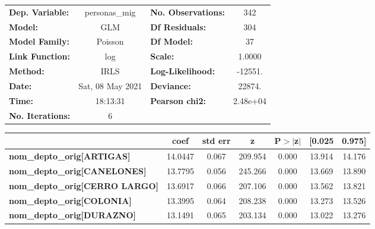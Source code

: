 \begin{center}
\begin{tabular}{lclc}
\toprule
\textbf{Dep. Variable:}                    &  personas\_mig   & \textbf{  No. Observations:  } &      342    \\
\textbf{Model:}                            &       GLM        & \textbf{  Df Residuals:      } &      304    \\
\textbf{Model Family:}                     &     Poisson      & \textbf{  Df Model:          } &       37    \\
\textbf{Link Function:}                    &       log        & \textbf{  Scale:             } &    1.0000   \\
\textbf{Method:}                           &       IRLS       & \textbf{  Log-Likelihood:    } &   -12551.   \\
\textbf{Date:}                             & Sat, 08 May 2021 & \textbf{  Deviance:          } &    22874.   \\
\textbf{Time:}                             &     18:13:31     & \textbf{  Pearson chi2:      } &  2.48e+04   \\
\textbf{No. Iterations:}                   &        6         & \textbf{                     } &             \\
\bottomrule
\end{tabular}
\begin{tabular}{lcccccc}
                                           & \textbf{coef} & \textbf{std err} & \textbf{z} & \textbf{P$> |$z$|$} & \textbf{[0.025} & \textbf{0.975]}  \\
\midrule
\textbf{nom\_depto\_orig[ARTIGAS]}         &      14.0447  &        0.067     &   209.954  &         0.000        &       13.914    &       14.176     \\
\textbf{nom\_depto\_orig[CANELONES]}       &      13.7795  &        0.056     &   245.266  &         0.000        &       13.669    &       13.890     \\
\textbf{nom\_depto\_orig[CERRO LARGO]}     &      13.6917  &        0.066     &   207.106  &         0.000        &       13.562    &       13.821     \\
\textbf{nom\_depto\_orig[COLONIA]}         &      13.3995  &        0.064     &   208.238  &         0.000        &       13.273    &       13.526     \\
\textbf{nom\_depto\_orig[DURAZNO]}         &      13.1491  &        0.065     &   203.134  &         0.000        &       13.022    &       13.276     \\

\end{tabular}
\end{center}
